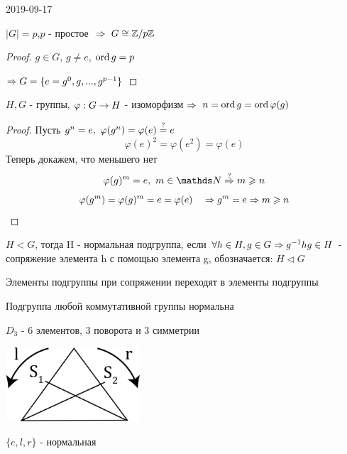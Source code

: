 \documentclass[main]{subfiles}
\begin{document}
\begin{lect} {2019-09-17}
		\begin{utv}
		    $|G|=p$,\q $p$ - простое $\ \Rightarrow\  G \cong \mathbb{Z} /p \mathbb{Z}$
		\end{utv}

		\begin{proof}
		    $g \in G$, $g \neq e$, $\mathop{\rm ord}\nolimits g=p$

		    $\Rightarrow G=\{e=g^0,g,...,g^{p-1}\}$
		\end{proof}

		\begin{utv}
		    $H,G$ - группы, $\varphi: G \rightarrow H$ - изоморфизм $\Rightarrow$ $n=\mathop{\rm ord}\nolimits g=\mathop{\rm ord}\nolimits \varphi(g)$
		\end{utv}

		\begin{proof}
		    Пусть $g^n=e,\ \varphi(g^n)=\varphi(e)\os{?}{=}e$
		    \[\varphi(e)^2=\varphi(e^2)=\varphi(e)\]
		    Теперь докажем, что меньшего нет
		    \[\varphi(g)^m = e,\ m \in \N \os{?}{\Ra} m \geqslant n\]
			\[\varphi(g^m) = \varphi(g)^m = e = \varphi(e) \quad \Rightarrow g^m = e \Rightarrow m \geqslant n\]
		\end{proof}

		\begin{definition}
		    $H<G$, тогда H - нормальная подгруппа, если $\forall h \in H, g \in G \Rightarrow g^{-1}h g \in H$ - сопряжение элемента h с помощью элемента g, обозначается: $H \triangleleft G$
		\end{definition}

		\begin{remark}
		    Элементы подгруппы при сопряжении переходят в элементы подгруппы
		\end{remark}

		\begin{remark}
		    Подгруппа любой коммутативной группы нормальна
		\end{remark}

		\begin{example}
		    $D_3$ - 6 элементов, 3 поворота и 3 симметрии

		    \includegraphics[width = 5cm]{pics/triangle_d_3.png}

		    $\{e,l,r\}$ - нормальная


\end{example}
\end{lect}
\end{document}
